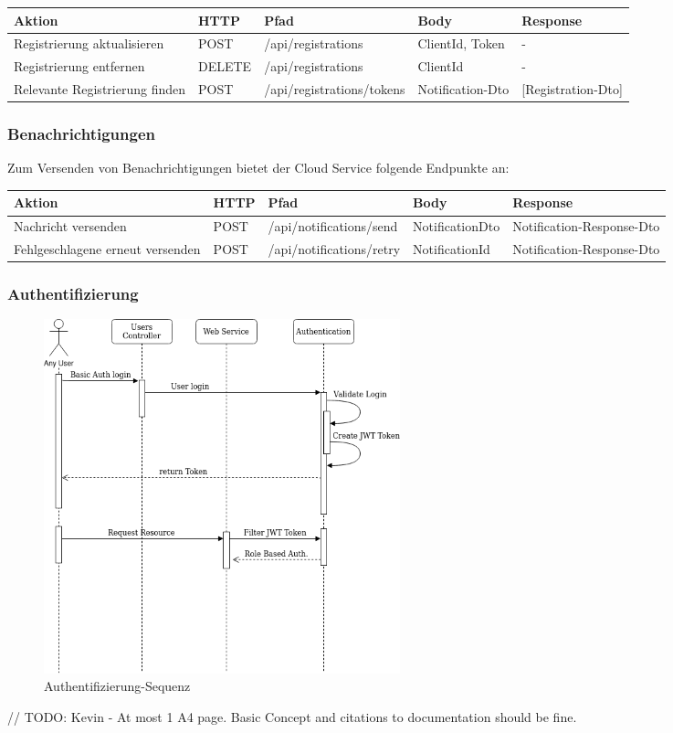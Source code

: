 \begin{tabularx}{\textwidth}{|p{5cm}|l|l|X|X|}
    \hline
    \textbf{Aktion}                & \textbf{HTTP} & \textbf{Pfad}             & \textbf{Body}   & \textbf{Response} \\
    \hline
    Registrierung aktualisieren    & POST          & /api/registrations       & ClientId, Token & -                 \\
    \hline
    Registrierung entfernen        & DELETE        & /api/registrations       & ClientId        & -                 \\
    \hline
    Relevante Registrierung finden & POST          & /api/registrations/tokens & Notification-Dto & [Registration-Dto] \\
    \hline
\end{tabularx}\label{tab:registrationsapimethods}

\subsubsection*{Benachrichtigungen}

Zum Versenden von Benachrichtigungen bietet der Cloud Service folgende Endpunkte an:

\begin{tabularx}{\textwidth}{|p{5cm}|l|l|l|X|}
    \hline
    \textbf{Aktion}                  & \textbf{HTTP} & \textbf{Pfad}            & \textbf{Body}   & \textbf{Response}       \\
    \hline
    Nachricht versenden              & POST          & /api/notifications/send & NotificationDto & Notification-Response-Dto \\
    \hline
    Fehlgeschlagene erneut versenden & POST          & /api/notifications/retry & NotificationId  & Notification-Response-Dto \\
    \hline
\end{tabularx}\label{tab:registrationsapimethodss}

\clearpage

\subsubsection*{Authentifizierung}
\begin{figure}[h]
    \centering
    \includegraphics[width=0.5\textwidth]{graphics/Authentication-export}\caption[Authentifizierung-Sequenz]{Authentifizierung-Sequenz}
\end{figure}

// TODO: Kevin - At most 1 A4 page. Basic Concept and citations to documentation should be fine.

\clearpage

